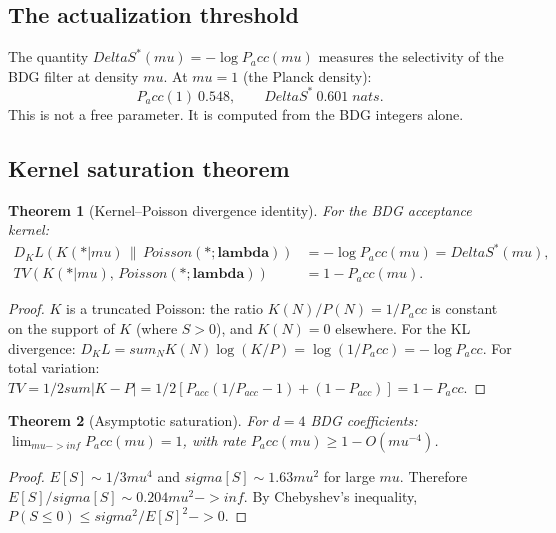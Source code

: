 \documentclass[11pt]{article}
\def\Delta{Delta}%
\def\sigma{sigma}%
\def\mu{mu}%
\def\lambda{lambda}%
\def\mathrm#1{#1}%
\def\mathbf#1{#1}%
\def\mathbb#1{#1}%
\def\frac#1#2{#1/#2}%
\def\cdot{*}%
\def\approx{~}%
\def\to{->}%
\def\infty{inf}%
\def\sum{sum}%
\def\Pacc{P_acc}%
\def\Dkl{D_KL}%
\def\TV{TV}%
\newtheorem{theorem}{Theorem}
\newcommand{\Pacc}{P_{\mathrm{acc}}}
\newcommand{\Dkl}{D_{\mathrm{KL}}}
\newcommand{\TV}{\mathrm{TV}}
\begin{document}
\subsection{The actualization threshold}

The quantity $\Delta S^*(\mu)=-\log\Pacc(\mu)$ measures the selectivity of the BDG filter at density $\mu$. At $\mu=1$ (the Planck density):
\begin{equation}
\Pacc(1)\approx 0.548, \qquad \Delta S^* \approx 0.601 \;\mathrm{nats}.
\end{equation}
This is not a free parameter. It is computed from the BDG integers alone.

\subsection{Kernel saturation theorem}

\begin{theorem}[Kernel--Poisson divergence identity]
\label{thm:kl}
For the BDG acceptance kernel:
\begin{align}
\Dkl(K(\cdot|\mu)\,\|\,\mathrm{Poisson}(\cdot;\boldsymbol{\lambda})) &= -\log\Pacc(\mu) = \Delta S^*(\mu), \label{eq:kl}\\
\TV(K(\cdot|\mu),\,\mathrm{Poisson}(\cdot;\boldsymbol{\lambda})) &= 1-\Pacc(\mu). \label{eq:tv}
\end{align}
\end{theorem}
\begin{proof}
$K$ is a truncated Poisson: the ratio $K(\mathbf{N})/P(\mathbf{N})=1/\Pacc$ is constant on the support of $K$ (where $S>0$), and $K(\mathbf{N})=0$ elsewhere. For the KL divergence: $\Dkl=\sum_{\mathbf{N}} K(\mathbf{N})\log(K/P)=\log(1/\Pacc)=-\log\Pacc$. For total variation: $\TV=\frac{1}{2}\sum|K-P|=\frac{1}{2}[P_{\mathrm{acc}}(1/P_{\mathrm{acc}}-1)+(1-P_{\mathrm{acc}})]=1-\Pacc$.
\end{proof}

\begin{theorem}[Asymptotic saturation]
\label{thm:saturation}
For $d=4$ BDG coefficients: $\lim_{\mu\to\infty}\Pacc(\mu)=1$, with rate $\Pacc(\mu)\ge 1-O(\mu^{-4})$.
\end{theorem}
\begin{proof}
$\mathbb{E}[S]\sim\frac{1}{3}\mu^4$ and $\sigma[S]\sim 1.63\mu^2$ for large $\mu$. Therefore $\mathbb{E}[S]/\sigma[S]\sim 0.204\mu^2\to\infty$. By Chebyshev's inequality, $\mathbb{P}(S\le 0)\le\sigma^2/\mathbb{E}[S]^2\to 0$.
\end{proof}
\end{document}
